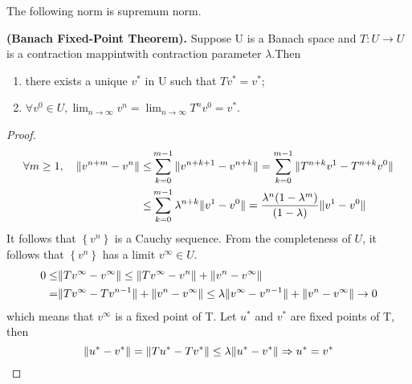 The following norm is supremum norm.
\begin{theorem}
    \textbf{(Banach Fixed-Point Theorem).} Suppose U is a Banach space and $ T: U \rightarrow U $ is a contraction mappintwith contraction parameter $ \lambda $.Then
    \begin{enumerate}
        \item there exists a unique $ v^* $ in U such that $ T v^* = v^* $;
            \item $ \forall v^0 \in U, \lim_{n \to \infty} v^n = \lim_{n \to \infty} T^n v^0 = v^* $.
    \end{enumerate}
    \begin{proof}
        \begin{align*}
            \forall m \ge 1,\quad \Arrowvert v^{n+m} - v^n \Arrowvert 
            \le& \sum^{m-1}_{k=0} \Arrowvert v^{n+k+1} - v^{n+k} \Arrowvert
            = \sum^{m-1}_{k=0} \Arrowvert T^{n+k} v^1 - T^{n+k} v^{0} \Arrowvert\\
            \le& \sum^{m-1}_{k=0} \lambda^{n+k} \Arrowvert v^1 - v^{0} \Arrowvert
            = \frac{\lambda^n (1-\lambda^m) }{(1-\lambda)} \Arrowvert v^1 - v^0 \Arrowvert
        \end{align*}
        It follows that $ \left\{ v^n \right\} $ is a Cauchy sequence.
        From the completeness of $ U $, it follows that $ \left\{ v^n \right\} $ has a limit $ v^\infty \in U $.
        \begin{align*}
            0 \le& \Arrowvert T v^\infty - v^\infty \Arrowvert 
            \le \Arrowvert T v^\infty - v^n \Arrowvert + \Arrowvert v^n - v^\infty \Arrowvert \\
            =& \Arrowvert Tv^\infty - Tv^{n-1} \Arrowvert + \Arrowvert v^n - v^\infty \Arrowvert
            \le \lambda \Arrowvert v^\infty - v^{n-1} \Arrowvert + \Arrowvert v^n - v^\infty \Arrowvert
            \rightarrow 0
        \end{align*}
        which means that $ v^\infty$ is a fixed point of T.
        Let $ u^* $ and $ v^* $ are fixed points of T, then
        \[
            \Arrowvert u^* - v^* \Arrowvert = \Arrowvert Tu^* - Tv^* \Arrowvert
            \le \lambda \Arrowvert u^* - v^* \Arrowvert
            \Rightarrow u^* = v^*
        \]
    \end{proof}
\end{theorem}

